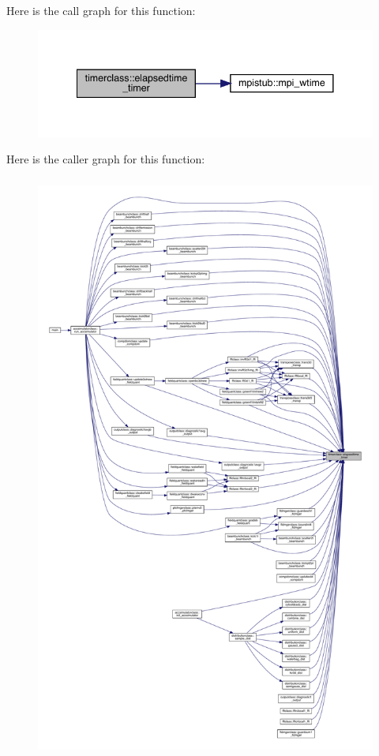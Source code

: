 Here is the call graph for this function\+:\nopagebreak
\begin{figure}[H]
\begin{center}
\leavevmode
\includegraphics[width=341pt]{namespacetimerclass_a3378d323d442f85aff95ab73cd13376d_cgraph}
\end{center}
\end{figure}
Here is the caller graph for this function\+:
\nopagebreak
\begin{figure}[H]
\begin{center}
\leavevmode
\includegraphics[height=550pt]{namespacetimerclass_a3378d323d442f85aff95ab73cd13376d_icgraph}
\end{center}
\end{figure}
\mbox{\label{namespacetimerclass_a3535b11970327778ddd27cee93c2288b}} 
